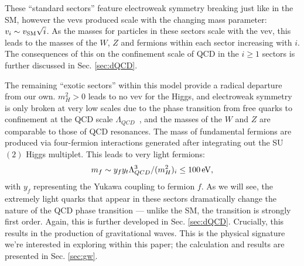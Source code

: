 \documentclass[nofootinbib,twocolumn,preprintnumbers]{revtex4-1}
\begin{document}
%
These ``standard sectors'' feature electroweak symmetry breaking just like in the SM, however the vevs produced scale with the changing mass parameter: $v_i \sim v_{\rm SM}\sqrt{i}$. As the masses for particles in these sectors scale with the vev, this leads to the masses of the $W$, $Z$ and fermions within each sector increasing with $i$. The consequences of this on the confinement scale of QCD in the $i \geq 1$ sectors is further discussed in Sec. \ref{sec:dQCD}. 

The remaining ``exotic sectors'' within this model provide a radical departure from our own. $m_H^2 > 0$ leads to no vev for the Higgs, and electroweak symmetry is only broken at very low scales due to the phase transition from free quarks to confinement at the QCD scale $\Lambda_{QCD}$~\cite{}, and the masses of the $W$ and $Z$ are comparable to those of QCD resonances. The mass of fundamental fermions are produced via four-fermion interactions generated after integrating out the SU$(2)$ Higgs multiplet. This leads to very light fermions: 
\begin{equation}\label{eqn:exoticFM}
m_f \sim y_f y_t \Lambda_{QCD}^3/(m^2_H)_i \leq 100 \,{\rm eV},
\end{equation}
with $y_f$ representing the Yukawa coupling to fermion $f$. As we will see, the extremely light quarks that appear in these sectors dramatically change the nature of the QCD phase transition --- unlike the SM, the transition is strongly first order. Again, this is further developed in Sec. \ref{sec:dQCD}. Crucially, this results in the production of gravitational waves. This is the physical signature we're interested in exploring within this paper; the calculation and results are presented in Sec. \ref{sec:gw}. 
\end{document}
